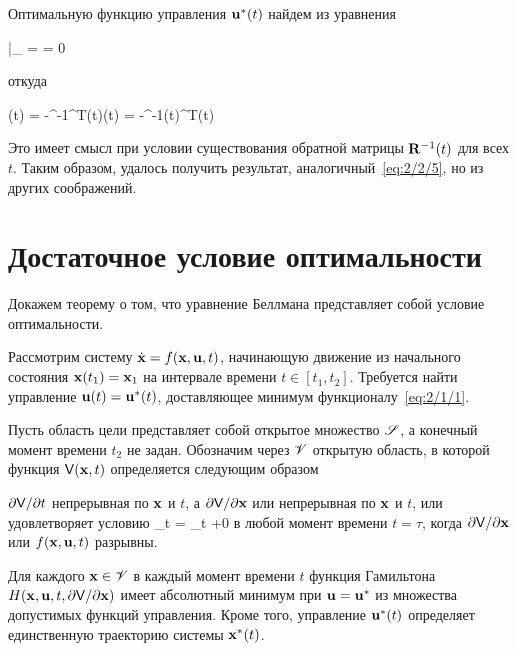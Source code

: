 Оптимальную функцию управления ${\mathbf{u}^{*}}(t)$ найдем из уравнения

\beqn
    \biggm|_{ = \optU} = 0 \text{,}
\eeqn

откуда

    \optU(t) = -^{-1}^T(t)\m{\psi}(t) = -^{-1}(t)^T(t) 
\eeq

Это имеет смысл при условии существования обратной матрицы $\mathbf{R}^{-1}(t)$ для всех $t$. Таким образом, удалось получить результат, аналогичный~\vref{eq:2/2/5}, но из других соображений.



\section{Достаточное условие оптимальности}



Докажем теорему о том, что уравнение Беллмана представляет собой условие оптимальности\cite{TCHAMRAN}.

    Рассмотрим систему $\dot{\mathbf{x}} = f(\mathbf{x}, \mathbf{u}, t)$, начинающую движение из начального состояния $\mathbf{x}(t_1) = \mathbf{x}_1$ на интервале времени $t \in [t_1, t_2]$. Требуется найти управление $\mathbf{u}(t) = {\mathbf{u}^{*}}(t)$, доставляющее минимум функционалу~\vref{eq:2/1/1}.

    Пусть область цели представляет собой открытое множество $\mathscr{S}$, а конечный момент времени $t_2$ не задан. Обозначим через $\mathscr{V}$ открытую область, в которой функция $\mathsf{V}(\mathbf{x}, t)$ определяется следующим образом

    \benum
        \item
            $\partial {  \mathsf{V}  } / \partial {t}$ непрерывная по $\mathbf{x}$ и $t$, а $\partial {  \mathsf{V}  } / \partial {  \mathbf{x}  }$ или непрерывная по $\mathbf{x}$ и $t$, или удовлетворяет условию
                \lim\limits_{t \to {}}  = \lim\limits_{t \to \tau+0} 
            \eeq
            в любой момент времени $t = \tau$, когда $\partial {  \mathsf{V}  } / \partial {  \mathbf{x}  }$ или $f(\mathbf{x}, \mathbf{u}, t)$ разрывны.

        \item
            Для каждого $\mathbf{x} \in \mathscr{V}$ в каждый момент времени $t$ функция Гамильтона $H(\mathbf{x}, \mathbf{u}, t, \partial {  \mathsf{V}  } / \partial {  \mathbf{x}  })$ имеет абсолютный минимум при $\mathbf{u} = {\mathbf{u}^{*}}$ из множества допустимых функций управления. Кроме того, управление ${\mathbf{u}^{*}}(t)$ определяет единственную траекторию системы ${\mathbf{x}^{*}}(t)$.

